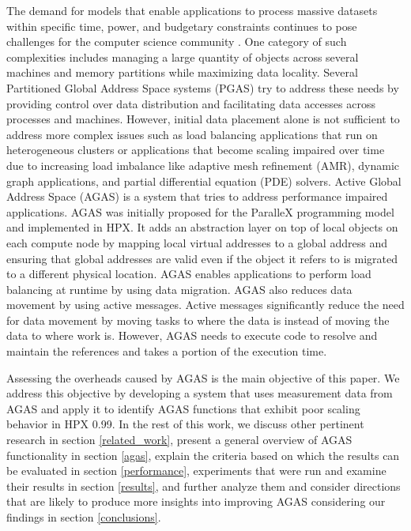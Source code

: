 The demand for models that enable applications to process massive
datasets within specific time, power, and budgetary constraints continues to
pose challenges for the computer science community
\cite{Amarasinghe091exascale,Sterling2009}. One category of such complexities
includes managing a large quantity of objects across several machines and
memory partitions while maximizing data locality. Several Partitioned Global
Address Space systems (PGAS) \cite{pgasorg} try to address these needs by
providing control over data distribution and facilitating data accesses across
processes and machines. However, initial data placement alone is not sufficient
to address more complex issues such as load balancing applications that run on heterogeneous clusters or applications
that become scaling impaired over time due to increasing load imbalance like
adaptive mesh refinement (AMR), dynamic graph applications, and partial
differential equation (PDE) solvers\cite{5364511,Anderson2011a,Dekate2011}.
Active Global Address Space (AGAS) is a system that tries to address
performance impaired applications. AGAS was initially proposed for the ParalleX
programming model\cite{5364511} and implemented in HPX. It adds an abstraction
layer on top of local objects on each compute node by mapping local virtual
addresses to a global address and ensuring that global addresses are valid even
if the object it refers to is migrated to a different physical location. AGAS
enables applications to perform load balancing at runtime by using data
migration.  AGAS also reduces data movement by using active messages. Active
messages significantly reduce the need for data movement by moving tasks to
where the data is instead of moving the data to where work is. 
However, AGAS needs to execute code to resolve and maintain the references and
takes a portion of the execution time.


Assessing the overheads caused by AGAS is the main objective of this paper. We
address this objective by developing a system that uses measurement data from
AGAS and apply it to identify AGAS functions that exhibit poor scaling
behavior in HPX 0.99. In the rest of this work, we discuss other pertinent
research in section \ref{related_work}, present a general overview of AGAS
functionality in section \ref{agas}, explain the criteria based on which the
results can be evaluated in section \ref{performance}, experiments that were
run and examine their results in section \ref{results}, and further analyze
them and consider directions that are likely to produce more insights into
improving AGAS considering our findings in section \ref{conclusions}.
